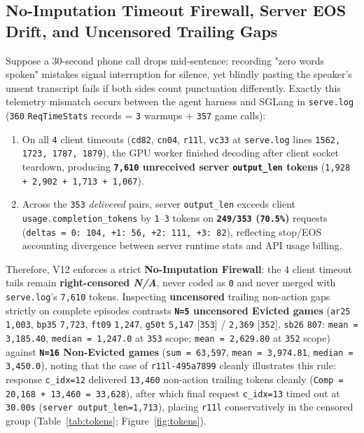 \documentclass[10pt]{article}
\newcommand{\code}[1]{\texttt{#1}}
\newcommand{\na}{\textit{N/A}}
\begin{document}
\subsection{No-Imputation Timeout Firewall, Server EOS Drift, and Uncensored Trailing Gaps}
Suppose a 30-second phone call drops mid-sentence: recording "zero words spoken" mistakes signal interruption for silence, yet blindly pasting the speaker's unsent transcript fails if both sides count punctuation differently. Exactly this telemetry mismatch occurs between the agent harness and SGLang in \code{serve.log} (\code{360} \code{ReqTimeStats} records = \code{3} warmups + \code{357} game calls):
\begin{enumerate}[leftmargin=1.4em,itemsep=2pt]
\item On all \code{4} client timeouts (\code{cd82}, \code{cn04}, \code{r11l}, \code{vc33} at \code{serve.log} lines \code{1562, 1723, 1787, 1879}), the GPU worker finished decoding after client socket teardown, producing \textbf{\code{7,610} unreceived server \code{output\_len} tokens} (\code{1,928 + 2,902 + 1,713 + 1,067}).
\item Across the \code{353} \emph{delivered} pairs, server \code{output\_len} exceeds client \code{usage.completion\_tokens} by \code{1}--\code{3} tokens on \textbf{\code{249/353} (\code{70.5\%})} requests (\code{deltas = {0: 104, +1: 56, +2: 111, +3: 82}}), reflecting stop/EOS accounting divergence between server runtime stats and API usage billing.
\end{enumerate}

Therefore, V12 enforces a strict \textbf{No-Imputation Firewall}: the 4 client timeout tails remain \textbf{right-censored \na{}}, never coded as \code{0} and never merged with \code{serve.log}'s \code{7,610} tokens. Inspecting \textbf{uncensored} trailing non-action gaps strictly on complete episodes contrasts \textbf{\code{N=5} uncensored Evicted games} (\code{ar25} \code{1,003}, \code{bp35} \code{7,723}, \code{ft09} \code{1,247}, \code{g50t} \code{5,147} [\code{353}] / \code{2,369} [\code{352}], \code{sb26} \code{807}: \code{mean = 3,185.40}, \code{median = 1,247.0} at \code{353} scope; \code{mean = 2,629.80} at \code{352} scope) against \textbf{\code{N=16} Non-Evicted games} (\code{sum = 63,597}, \code{mean = 3,974.81}, \code{median = 3,450.0}), noting that the case of \code{r11l-495a7899} cleanly illustrates this rule: response \code{c\_idx=12} delivered \code{13,460} non-action trailing tokens cleanly (\code{Comp = 20,168 + 13,460 = 33,628}), after which final request \code{c\_idx=13} timed out at \code{30.00s} (\code{server output\_len=1,713}), placing \code{r11l} conservatively in the censored group (Table~\ref{tab:tokens}; Figure~\ref{fig:tokens}).
\end{document}
